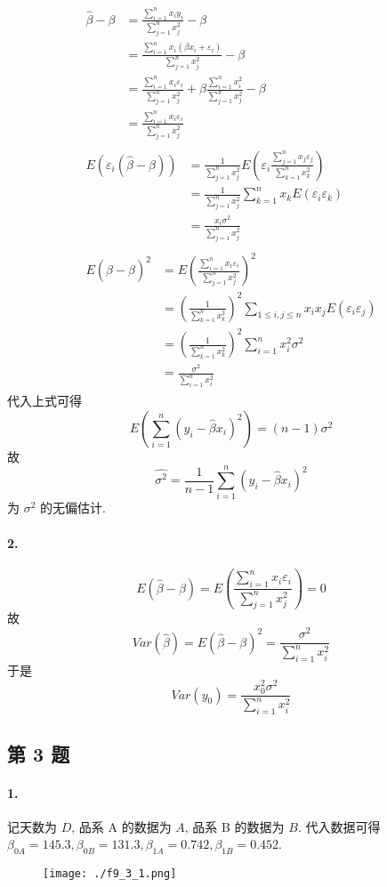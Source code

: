 \documentclass[../main.tex]{subfiles}
\begin{document}
\begin{gather*}
    \begin{aligned}
        \widehat{\beta} - \beta
        &= \frac{\sum_{i = 1}^{n} x_i y_i}{\sum_{j = 1}^{n} x_j^2} - \beta \\
        &= \frac{\sum_{i = 1}^{n} x_i \left( \beta x_i + \varepsilon_i \right)}{\sum_{j = 1}^{n} x_j^2} - \beta \\
        &= \frac{\sum_{i = 1}^{n} x_i \varepsilon_i}{\sum_{j = 1}^{n} x_j^2} + \beta \frac{\sum_{i = 1}^{n} x_i^2}{\sum_{j = 1}^{n}x_j^2} - \beta \\
        &= \frac{\sum_{i = 1}^{n} x_i \varepsilon_i}{\sum_{j = 1}^{n} x_j^2}
    \end{aligned} \\
    \begin{aligned}
        E (\varepsilon_i (\widehat{\beta} - \beta))
        &= \frac{1}{\sum_{j = 1}^{n} x_j^2} E \left( \varepsilon_i \frac{\sum_{j = 1}^{n} x_j \varepsilon_j}{\sum_{k = 1}^{n} x_k^2} \right) \\
        &= \frac{1}{\sum_{j = 1}^{n} x_j^2} \sum_{k = 1}^{n} x_k E \left( \varepsilon_i \varepsilon_k \right) \\
        &= \frac{x_i \sigma^2}{\sum_{j = 1}^{n} x_j^2}
    \end{aligned} \\
    \begin{aligned}
        E (\widehat{\beta} - \beta)^2
        &= E \left( \frac{\sum_{i = 1}^{n} x_i \varepsilon_i}{\sum_{j = 1}^{n} x_j^2} \right)^2 \\
        &= \left( \frac{1}{\sum_{k = 1}^{n} x_k^2} \right)^2 \sum_{1 \leqslant i, j \leqslant n} x_i x_j E \left( \varepsilon_i \varepsilon_j \right) \\
        &= \left( \frac{1}{\sum_{k = 1}^{n} x_k^2} \right)^2 \sum_{i = 1}^{n} x_i^2 \sigma^2 \\
        &= \frac{\sigma^2}{\sum_{i = 1}^{n} x_i^2}
    \end{aligned}
\end{gather*}
代入上式可得
\[
    E \left( \sum_{i = 1}^{n} ( y_i - \widehat{\beta} x_i )^2 \right)
    =
    \left( n - 1 \right) \sigma^2
\]
故
\[
    \widehat{\sigma^2} = \frac{1}{n - 1} \sum_{i = 1}^{n} (y_i - \widehat{\beta} x_i)^2
\]
为 $\sigma^2$ 的无偏估计.

\noindent\paragraph*{2.}
\[
    E (\widehat{\beta} - \beta)
    = E \left( \frac{\sum_{i = 1}^{n} x_i \varepsilon_i}{\sum_{j = 1}^{n} x_j^2} \right)
    = 0
\]
故
\[
    Var (\widehat{\beta})
    = E (\widehat{\beta} - \beta)^2
    = \frac{\sigma^2}{\sum_{i = 1}^{n} x_i^2}
\]
于是
\[
    Var \left( y_0 \right)
    = \frac{x_0^2 \sigma^2}{\sum_{i = 1}^{n} x_i^2}
\]

\subsection{第 3 题}
\noindent\paragraph*{1.}
记天数为 $D$, 品系 A 的数据为 $A$, 品系 B 的数据为 $B$.
代入数据可得 $\beta_{0A} = 145.3, \beta_{0B} = 131.3, \beta_{1A} = 0.742, \beta_{1B} = 0.452$.
\begin{figure}[htpb]
    \centering
    \texttt{[image: ./f9\_3\_1.png]}
\end{figure}
\end{document}
